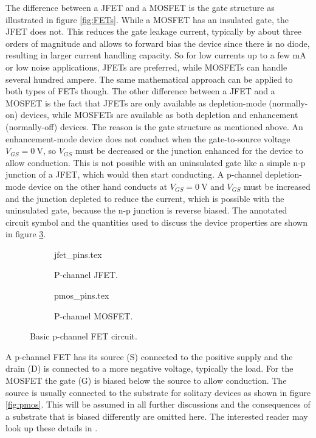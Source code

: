 The difference between a JFET and a MOSFET is the gate structure as illustrated in figure \ref{fig:FETs}. While a MOSFET has an insulated gate, the JFET does not. This reduces the gate leakage current, typically by about three orders of magnitude and allows to forward bias the device since there is no diode, resulting in larger current handling capacity. So for low currents up to a few \unit{\mA} or low noise applications, JFETs are preferred, while MOSFETs can handle several hundred ampere. The same mathematical approach can be applied to both types of FETs though. The other difference between a JFET and a MOSFET is the fact that JFETs are only available as depletion-mode (normally-on) devices, while MOSFETs are available as both depletion and enhancement (normally-off) devices. The reason is the gate structure as mentioned above. An enhancement-mode device does not conduct when the gate-to-source voltage $V_{GS} = \qty{0}{\V}$, so $V_{GS}$ must be decreased or the junction enhanced for the device to allow conduction. This is not possible with an uninsulated gate like a simple n-p junction of a JFET, which would then start conducting. A p-channel depletion-mode device on the other hand conducts at $V_{GS} = \qty{0}{\V}$ and $V_{GS}$ must be increased and the junction depleted to reduce the current, which is possible with the uninsulated gate, because the n-p junction is reverse biased. The annotated circuit symbol and the quantities used to discuss the device properties are shown in figure \ref{fig:fet_symbols}.

\begin{figure}[ht]
    \centering
    \begin{subfigure}{0.4\linewidth}
        \centering
        {jfet_pins.tex}
        \caption{P-channel JFET.}
        \label{fig:fet_symbols_jfet}
    \end{subfigure}
    \begin{subfigure}{0.4\linewidth}
        \centering
        {pmos_pins.tex}
        \caption{P-channel MOSFET.}
        \label{fig:fet_symbols_mosfet}
    \end{subfigure}
    \caption{Basic p-channel FET circuit.}
    \label{fig:fet_symbols}
\end{figure}

A p-channel FET has its source (S) connected to the positive supply and the drain (D) is connected to a more negative voltage, typically the load. For the MOSFET the gate (G) is biased below the source to allow conduction. The source is usually connected to the substrate for solitary devices as shown in figure \ref{fig:pmos}. This will be assumed in all further discussions and the consequences of a substrate that is biased differently are omitted here. The interested reader may look up these details in \cite{mosfet_details}.

